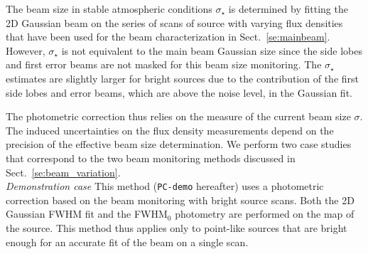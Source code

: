 The beam size in stable atmospheric conditions $\sigma_\star$ is
determined by fitting the 2D Gaussian beam on the series of scans of
source with varying flux densities that have been used for the beam
characterization in Sect.~\ref{se:mainbeam}. However, $\sigma_\star$
is not equivalent to the main beam Gaussian size since the side lobes
and first error beams are not masked for this beam size
monitoring. The $\sigma_\star$ estimates are slightly
larger for bright sources due to the contribution of the first side
lobes and error beams, which are above the noise level, in the Gaussian fit.


The photometric correction thus relies on the measure of the current beam size
$\sigma$. The induced uncertainties on the flux density measurements depend on
the precision of the effective beam size determination. We perform two case
studies that correspond to the two beam monitoring methods discussed in
Sect.~\ref{se:beam_variation}.\\

\noindent \emph{Demonstration case} This method ({\tt PC-demo} hereafter) uses a
photometric correction based on the beam monitoring with bright source
scans. Both the 2D Gaussian FWHM fit and the FWHM$_0$ photometry are performed
on the map of the source. This method thus applies only to point-like sources
that are bright enough for an accurate fit of the beam on a single scan.


